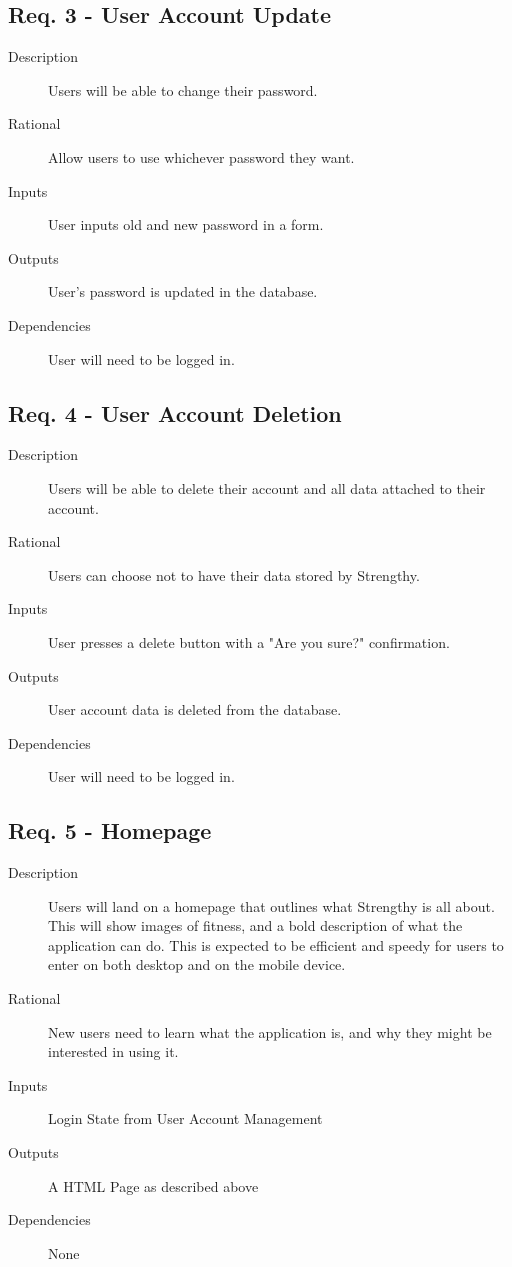 \documentclass[12pt]{article}
\begin{document}
\subsection{Req. 3 - User Account Update}
\begin{description}
	\item[Description] Users will be able to change their password.
	\item[Rational] Allow users to use whichever password they want.
	\item[Inputs] User inputs old and new password in a form.
	\item[Outputs] User's password is updated in the database.
	\item[Dependencies] User will need to be logged in.
\end{description}

\subsection{Req. 4 - User Account Deletion}
\begin{description}
	\item[Description] Users will be able to delete their account and all data attached to their account.
	\item[Rational] Users can choose not to have their data stored by Strengthy.
	\item[Inputs] User presses a delete button with a "Are you sure?" confirmation.
	\item[Outputs] User account data is deleted from the database.
	\item[Dependencies] User will need to be logged in.
\end{description}

\subsection{Req. 5 - Homepage}
\begin{description}
	\item[Description] Users will land on a homepage that outlines what Strengthy is all about. This will show images of fitness, and a bold description of what the application can do. This is expected to be efficient and speedy for users to enter on both desktop and on the mobile device.
	\item[Rational] New users need to learn what the application is, and why they might be interested in using it.
	\item[Inputs] Login State from User Account Management
	\item[Outputs] A HTML Page as described above
	\item[Dependencies] None
\end{description}
\end{document}
